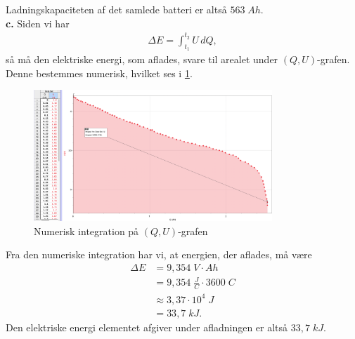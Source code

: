 \documentclass{report}
\begin{document}
Ladningskapaciteten af det samlede batteri er altså $563 \;\unit{Ah} $. \\[1ex]
\textbf{c.}
Siden vi har
\begin{equation*}
\begin{split}
  \Delta E = \int_{t_1}^{t_2} U \,dQ, 
\end{split}
\end{equation*}
så må den elektriske energi, som aflades, svare til arealet under $(Q, U)$-grafen.
Denne bestemmes numerisk, hvilket ses i \cref{fig:QU}.
\begin{figure}[H]
\begin{center}
  \includegraphics[width=0.8\textwidth]{QU.png}
\end{center}
  \caption{Numerisk integration på $(Q, U)$-grafen}
\label{fig:QU}
\end{figure}
Fra den numeriske integration har vi, at energien, der aflades, må være
\begin{equation*}
\begin{split}
  \Delta E&=9,354 \;\unit{V \cdot Ah} \\
  &=9,354 \;\unit{\frac{J}{C}} \cdot 3600 \;\unit{C} \\
  &\approx 3,37 \cdot 10^4 \;\unit{J} \\
  &=33,7 \;\unit{kJ}.
\end{split}
\end{equation*}
Den elektriske energi elementet afgiver under afladningen er altså $33,7 \;\unit{kJ} $.
\end{document}
